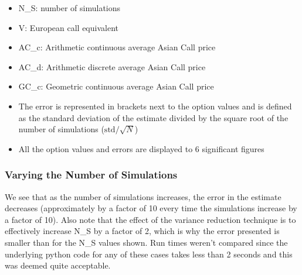 \documentclass{article}
\providecommand{\tightlist}{%
      \setlength{\itemsep}{0pt}\setlength{\parskip}{0pt}}
\begin{document}
\begin{itemize}
\tightlist
\item
  N\_S: number of simulations
\item
  V: European call equivalent
\item
  AC\_c: Arithmetic continuous average Asian Call price
\item
  AC\_d: Arithmetic discrete average Asian Call price
\item
  GC\_c: Geometric continuous average Asian Call price
\item
  The error is represented in brackets next to the option values and is
  defined as the standard deviation of the estimate divided by the
  square root of the number of simulations (\(\mathrm{std}/ \sqrt{N}\))
\item
  All the option values and errors are displayed to 6 significant
  figures
\end{itemize}

    \subsubsection{Varying the Number of
Simulations}\label{varying-the-number-of-simulations}

We see that as the number of simulations increases, the error in the
estimate decreases (approximately by a factor of 10 every time the
simulations increase by a factor of 10). Also note that the effect of
the variance reduction technique is to effectively increase N\_S by a
factor of 2, which is why the error presented is smaller than for the
N\_S values shown. Run times weren't compared since the underlying
python code for any of these cases takes less than 2 seconds and this
was deemed quite acceptable.
\end{document}
